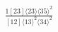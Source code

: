 \documentclass[varwidth, border=5pt]{standalone}
\begin{document}
\begin{my}
$\begin{gathered}
\scriptscriptstyle\frac{1[23]⟨23⟩⟨35⟩^2}{[12]⟨13⟩^2⟨34⟩^2}
\end{gathered}$
\end{my}
\end{document}
